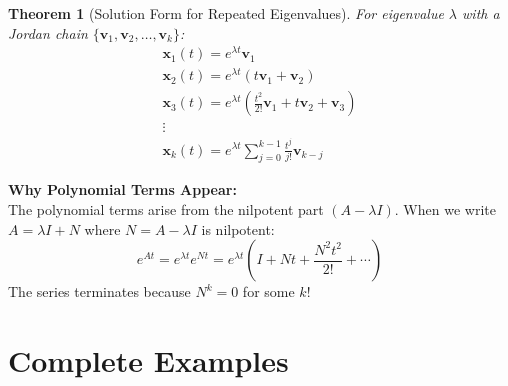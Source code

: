 \documentclass[12pt]{article}
\newtheorem{theorem}{Theorem}
\begin{document}
\begin{theorem}[Solution Form for Repeated Eigenvalues]
For eigenvalue $\lambda$ with a Jordan chain $\{\mathbf{v}_{1}, \mathbf{v}_{2}, \ldots, \mathbf{v}_{k}\}$:
\begin{gather}
\mathbf{x}_{1}(t) = e^{\lambda t}\mathbf{v}_{1} \\
\mathbf{x}_{2}(t) = e^{\lambda t}(t\mathbf{v}_{1} + \mathbf{v}_{2}) \\
\mathbf{x}_{3}(t) = e^{\lambda t}\left(\frac{t^{2}}{2!}\mathbf{v}_{1} + t\mathbf{v}_{2} + \mathbf{v}_{3}\right) \\
\vdots \\
\mathbf{x}_{k}(t) = e^{\lambda t}\sum_{j=0}^{k-1} \frac{t^{j}}{j!}\mathbf{v}_{k-j}
\end{gather}
\end{theorem}

\begin{keypoint}
\textbf{Why Polynomial Terms Appear:}\\
The polynomial terms arise from the nilpotent part $(A - \lambda I)$. When we write $A = \lambda I + N$ where $N = A - \lambda I$ is nilpotent:
\[e^{At} = e^{\lambda t} e^{Nt} = e^{\lambda t}\left(I + Nt + \frac{N^{2}t^2}{2!} + \cdots\right)\]
The series terminates because $N^{k} = 0$ for some $k$!
\end{keypoint}

\section{Complete Examples}
\end{document}
